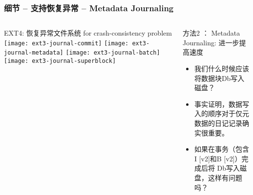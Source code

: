 \begin{frame}[fragile]
	\frametitle{细节 -- 支持恢复异常 -- Metadata Journaling}
	\begin{columns}
		\begin{column}{.5\textwidth}
			EXT4: 恢复异常文件系统 for crash-consistency problem
			\texttt{[image: ext3-journal-commit]}
			\texttt{[image: ext3-journal-metadata]}
			\texttt{[image: ext3-journal-batch]}
			\texttt{[image: ext3-journal-superblock]}
		\end{column}
		\begin{column}{.5\textwidth}			
			方法2 ： Metadata Journaling: 进一步提高速度
			\begin{itemize}
				\item  我们什么时候应该将数据块Db写入磁盘？ \pause
				\item 事实证明，数据写入的顺序对于仅元数据的日记记录确实很重要。
				\item  如果在事务（包含I [v2]和B [v2]）完成后将 Db写入磁盘，这样有问题吗？
			\end{itemize}
%				
		\end{column}
	\end{columns}
	
\end{frame}



